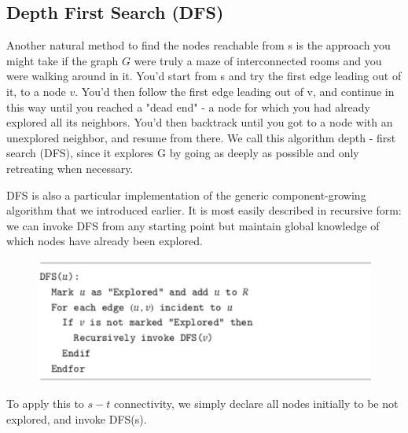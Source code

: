 \documentclass[12pt,a4paper]{book}
\begin{document}
\subsection{Depth First Search (DFS)}
Another natural method to find the nodes reachable from s is the approach you might take if the graph $G$ were truly a maze of interconnected rooms and you were walking around in it. You'd start from s and try the first edge leading out of it, to a node $v$. You'd then follow the first edge leading out of v, and continue in this way until you reached a "dead end" - a node for which you had already explored all its neighbors. You'd then backtrack until you got to a node with an unexplored neighbor, and resume from there. We call this algorithm depth - first search (DFS), since it explores G by going as deeply as possible and only retreating when necessary.\par
DFS is also a particular implementation of the generic component-growing algorithm that we introduced earlier. It is most easily described in recursive form: we can invoke DFS from any starting point but maintain global knowledge of which nodes have already been explored.\par
\begin{figure}[h]
    \centering
    \includegraphics[width=\textwidth]{simpleGraph6}
\end{figure}
To apply this to $s-t$ connectivity, we simply declare all nodes initially to be not explored, and invoke DFS(s).
\end{document}
